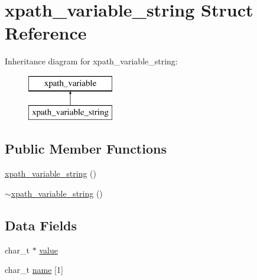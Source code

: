 \hypertarget{structxpath__variable__string}{\section{xpath\-\_\-variable\-\_\-string Struct Reference}
\label{structxpath__variable__string}
}
Inheritance diagram for xpath\-\_\-variable\-\_\-string\-:\begin{figure}[H]
\begin{center}
\leavevmode
\includegraphics[height=2.000000cm]{structxpath__variable__string}
\end{center}
\end{figure}
\subsection*{Public Member Functions}
\begin{DoxyCompactItemize}
\item 
\hyperlink{structxpath__variable__string_a119d348b7f76371928faa5f5f80df815}{xpath\-\_\-variable\-\_\-string} ()
\item 
\hyperlink{structxpath__variable__string_a8e5e421f2e963e6196d2812a623ee912}{$\sim$xpath\-\_\-variable\-\_\-string} ()
\end{DoxyCompactItemize}
\subsection*{Data Fields}
\begin{DoxyCompactItemize}
\item 
char\-\_\-t $\ast$ \hyperlink{structxpath__variable__string_aeb8a87a8457d2615cd7b766fd3f30559}{value}
\item 
char\-\_\-t \hyperlink{structxpath__variable__string_a5c43cdcc55a620db0e7bdd29b4d56e89}{name} \mbox{[}1\mbox{]}
\end{DoxyCompactItemize}


